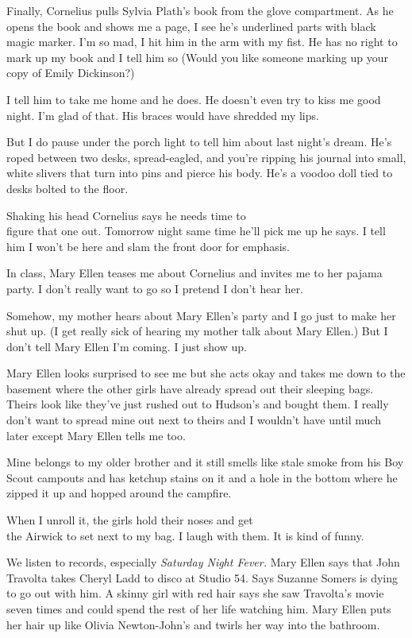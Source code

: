 \documentclass[
]{article}
\begin{document}
Finally, Cornelius pulls Sylvia Plath's book from the glove compartment.
As he opens the book and shows me a page, I see he's underlined parts
with black magic marker. I'm so mad, I hit him in the arm with my fist.
He has no right to mark up my book and I tell him so (Would you like
some­one marking up your copy of Emily Dickinson?)

I tell him to take me home and he does. He doesn't even try to kiss me
good night. I'm glad of that. His braces would have shredded my lips.

But I do pause under the porch light to tell him about last night's
dream. He's roped between two desks, spread-eagled, and you're ripping
his journal into small, white slivers that turn into pins and pierce his
body. He's a voodoo doll tied to desks bolted to the floor.

Shaking his head Cornelius says he needs time to\\
figure that one out. Tomorrow night same time he'll pick me up he says.
I tell him I won't be here and slam the front door for emphasis.

In class, Mary Ellen teases me about Cornelius and invites me to her
pajama party. I don't really want to go so I pretend I don't hear her.

Somehow, my mother hears about Mary Ellen's party and I go just to make
her shut up. (I get really sick of hearing my mother talk about Mary
Ellen.) But I don't tell Mary Ellen I'm coming. I just show up.

Mary Ellen looks surprised to see me but she acts okay and takes me down
to the basement where the other girls have already spread out their
sleeping bags. Theirs look like they've just rushed out to Hudson's and
bought them. I really don't want to spread mine out next to theirs and I
wouldn't have until much later except Mary Ellen tells me too.

Mine belongs to my older brother and it still smells like stale smoke
from his Boy Scout campouts and has ketchup stains on it and a hole in
the bottom where he zipped it up and hopped around the campfire.

When I unroll it, the girls hold their noses and get\\
the Airwick to set next to my bag. I laugh with them. It is kind of
funny.

We listen to records, especially \emph{Saturday Night Fever.} Mary Ellen
says that John Travolta takes Cheryl Ladd to disco at Studio 54. Says
Suzanne Somers is dying to go out with him. A skinny girl with red hair
says she saw Travolta's movie seven times and could spend the rest of
her life watch­ing him. Mary Ellen puts her hair up like Olivia
Newton-John's and twirls her way into the bathroom.
\end{document}
